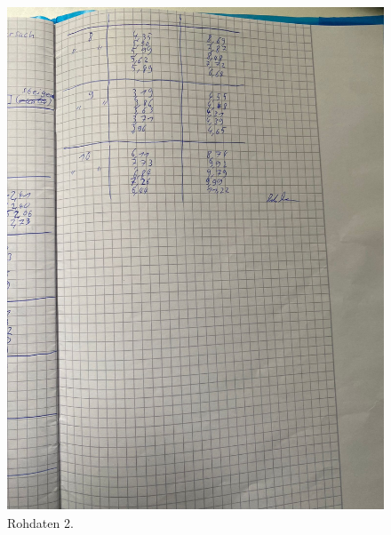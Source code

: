 \begin{figure}[H]
  \includegraphics[width=\textwidth, height=15cm]{Bilder/rohdaten2.jpg}
  \caption{Rohdaten 2.}
\end{figure}




